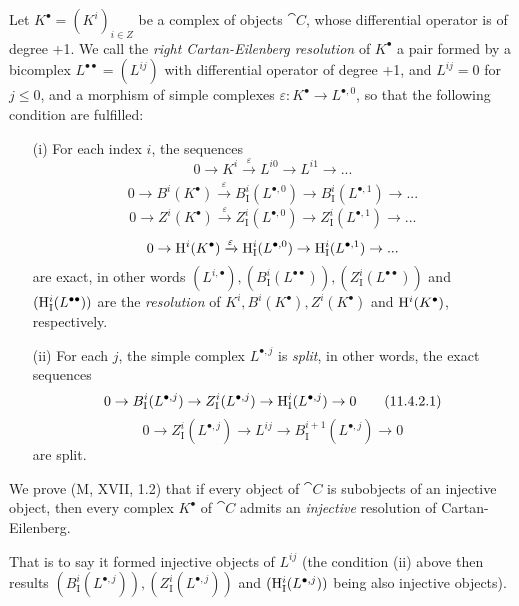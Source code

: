\begin{env}[11.4.2]
\label{0.11.4.2}
Let $K^\bullet = (K^i)_{i\in Z}$ be a complex of objects $\cat{C}$, whose differential operator is of degree +1.
We call the \emph{right Cartan-Eilenberg resolution} of $K^\bullet$ a pair formed by a bicomplex $L^{\bullet\bullet} = (L^{ij})$
with differential operator of degree +1, and $L^{ij}=0$ for $j\leq 0$, and a morphism of simple complexes $\varepsilon: K^\bullet \rightarrow L^{\bullet, 0}$,
so that the following condition are fulfilled:
\begin{enumerate}
  \item[(i)] For each index $i$, the sequences
  \[
    0 \rightarrow K^i \xrightarrow[]{\varepsilon} L^{i0} \rightarrow L^{i1} \rightarrow ...
  \]
  \[
    0 \rightarrow B^i(K^\bullet) \xrightarrow[]{\varepsilon} B_\text{I}^i(L^{\bullet,0}) \rightarrow B_\text{I}^i(L^{\bullet,1}) \rightarrow ...
  \]
  \[
    0 \rightarrow Z^i(K^\bullet) \xrightarrow[]{\varepsilon} Z_\text{I}^i(L^{\bullet,0}) \rightarrow Z_\text{I}^i(L^{\bullet,1}) \rightarrow ...
  \]
  \[
    0 \rightarrow \mathrm{H}^i(K^\bullet) \xrightarrow[]{\varepsilon} \mathrm{H}_\text{I}^i(L^{\bullet,0}) \rightarrow \mathrm{H}_\text{I}^i(L^{\bullet,1}) \rightarrow ...
  \]
  are exact, in other words $(L^{i,\bullet}), (B_\text{I}^i(L^{\bullet\bullet})), (Z_\text{I}^i(L^{\bullet\bullet}))$ and $(\mathrm{H}_\text{I}^i(L^{\bullet\bullet}))$ 
  are the \emph{resolution} of $K^i, B^i(K^\bullet), Z^i(K^\bullet)$ and $\mathrm{H}^i(K^\bullet)$, respectively.
  \item[(ii)] For each $j$, the simple complex $L^{\bullet, j}$ is \emph{split}, in other words, the exact sequences
  \[
    \label{0.11.4.2.1}
    0 \rightarrow B_\text{I}^i(L^{\bullet,j}) \rightarrow Z_\text{I}^i(L^{\bullet,j}) \rightarrow \mathrm{H}_\text{I}^i(L^{\bullet,j}) \rightarrow 0
    \tag{11.4.2.1}
  \]
  \[
    \label{0.11.4.2.2}
    0 \rightarrow Z_\text{I}^i(L^{\bullet,j}) \rightarrow L^{ij} \rightarrow B_\text{I}^{i+1}(L^{\bullet,j}) \rightarrow 0
    \tag{11.4.2.2}
  \]
  are split.
\end{enumerate}
We prove (M, XVII, 1.2) that if every object of $\cat{C}$ is subobjects of an injective object, 
then every complex $K^\bullet$ of $\cat{C}$ admits an \emph{injective} resolution of Cartan-Eilenberg.

That is to say it formed injective objects of $L^{ij}$ 
(the condition (ii) above then results $(B_\text{I}^i(L^{\bullet,j})), (Z_\text{I}^i(L^{\bullet,j}))$ and $(\mathrm{H}_\text{I}^i(L^{\bullet,j}))$ being also injective objects).


\end{env}
